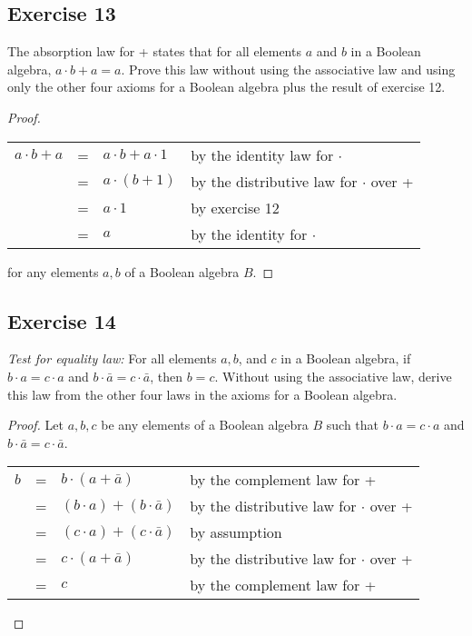 \documentclass[14pt]{extarticle}
\newcommand{\cy}{\color{cyan}}
\begin{document}
\subsection{Exercise 13}
The absorption law for + states that for all elements $a$ and $b$ in a Boolean algebra, \(a \cdot b + a = a\). Prove
this law without using the associative law and using only the other four axioms for a Boolean algebra plus the result
of exercise 12.

\begin{proof}
  \begin{center}
    \begin{tabular}{rcll}
      \(a \cdot b + a\) & = & \(a \cdot b + a \cdot 1\) & {\cy by the identity law for $\cdot$}            \\
                        & = & \(a \cdot (b + 1)\)       & {\cy by the distributive law for $\cdot$ over +} \\
                        & = & \(a \cdot 1\)             & {\cy by exercise 12}                             \\
                        & = & \(a\)                     & {\cy by the identity for $\cdot$}
    \end{tabular}
  \end{center}
  for any elements $a, b$ of a Boolean algebra $B$.
\end{proof}

\subsection{Exercise 14}
{\it Test for equality law:} For all elements $a, b$, and $c$ in a Boolean algebra, if \(b \cdot a = c \cdot a\) and
\(b \cdot \bar{a} = c \cdot \bar{a}\), then $b = c$. Without using the associative law, derive this law from the
other four laws in the axioms for a Boolean algebra.

\begin{proof}
  Let $a, b, c$ be any elements of a Boolean algebra $B$ such that \(b \cdot a = c \cdot a\) and
  \(b \cdot \bar{a} = c \cdot \bar{a}\).
  \begin{center}
    \begin{tabular}{rcll}
      \(b\) & = & \(b \cdot (a + \bar{a})\)           & {\cy by the complement law for +}                \\
            & = & \((b \cdot a) + (b \cdot \bar{a})\) & {\cy by the distributive law for $\cdot$ over +} \\
            & = & \((c \cdot a) + (c \cdot \bar{a})\) & {\cy by assumption}                              \\
            & = & \(c \cdot (a + \bar{a})\)           & {\cy by the distributive law for $\cdot$ over +} \\
            & = & \(c\)                               & {\cy by the complement law for +}
    \end{tabular}
  \end{center}
\end{proof}
\end{document}
